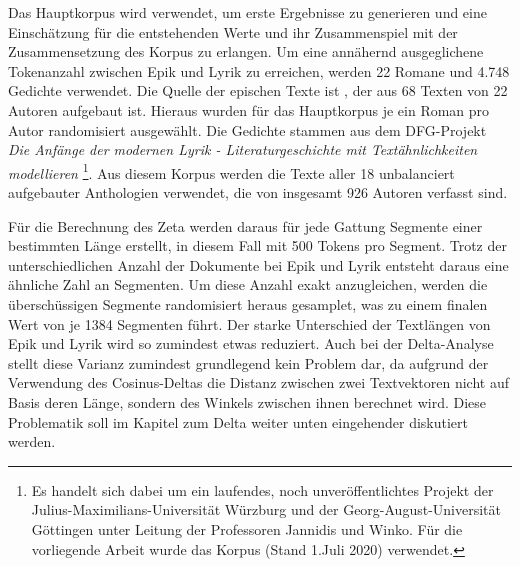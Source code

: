 \documentclass[a4paper,10p]{article}
\begin{document}
Das Hauptkorpus wird verwendet, um erste Ergebnisse zu generieren und eine Einschätz\-ung für die entstehenden Werte und ihr Zusammenspiel mit der Zusammensetzung des Korpus zu erlangen. Um eine annähernd ausgeglichene Tokenanzahl zwischen Epik und Lyrik zu erreichen, werden 22 Romane und 4.748 Gedichte verwendet. Die Quelle der epischen Texte ist \citep{ComputationalStylisticsGroup}, der aus 68 Texten von 22 Autoren aufgebaut ist. Hieraus wurden für das Hauptkorpus je ein Roman pro Autor randomisiert ausgewählt. Die Gedichte stammen aus dem DFG-Projekt \textit{Die Anfänge der modernen Lyrik - Literaturgeschichte mit Textähnlichkeiten modellieren} \footnote{Es handelt sich dabei um ein laufendes, noch unveröffentlichtes Projekt der Julius-Maximilians-Universität Würzburg und der Georg-August-Universität Göttingen unter Leitung der Professoren Jannidis und Winko. Für die vorliegende Arbeit wurde das Korpus (Stand 1.Juli 2020) verwendet.}. Aus diesem Korpus werden die Texte aller 18 unbalanciert aufgebauter Anthologien verwendet, die von insgesamt 926 Autoren verfasst sind. \par 

Für die Berechnung des Zeta werden daraus für jede Gattung Segmente einer bestimmten Länge erstellt, in diesem Fall mit 500 Tokens pro Segment. Trotz der unterschiedlichen Anzahl der Dokumente bei Epik und Lyrik entsteht daraus eine ähnliche Zahl an Segmenten. Um diese Anzahl exakt anzugleichen, werden die überschüssigen Segmente randomisiert heraus gesamplet, was zu einem finalen Wert von je 1384 Segmenten führt. Der starke Unterschied der Textlängen von Epik und Lyrik wird so zumindest etwas reduziert. Auch bei der Delta-Analyse stellt diese Varianz zumindest grundlegend kein Problem dar, da aufgrund der Verwendung des Cosinus-Deltas die Distanz zwischen zwei Textvektoren nicht auf Basis deren Länge, sondern des Winkels zwischen ihnen berechnet wird. Diese Problematik soll im Kapitel zum Delta weiter unten eingehender diskutiert werden. \par 
\end{document}
